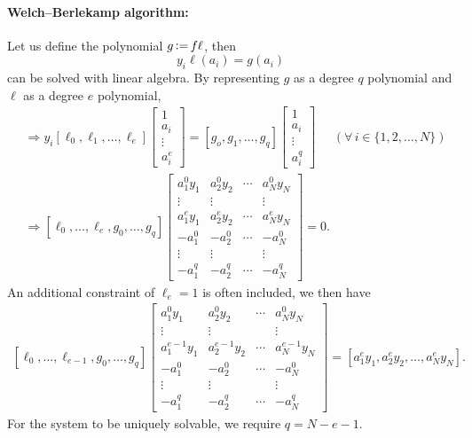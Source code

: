 \paragraph{Welch--Berlekamp algorithm:} Let us define the polynomial $g \operatorname{\vcentcolon=} f\ell$, then
\begin{equation}
    y_i \ell(a_i) = g(a_i)
\end{equation}
can be solved with linear algebra. By representing $g$ as a degree $q$ polynomial and $\ell$ as a degree $e$ polynomial,
\begin{align*}
    &\Rightarrow y_i \left[\ell_0,\ell_1,\ldots,\ell_{e}\right] \left[\begin{matrix}
        1 \\ a_i \\ \vdots \\ a_i^e
    \end{matrix}\right] = \left[g_o,g_1,\ldots,g_q\right]\left[\begin{matrix}
        1 \\ a_i \\ \vdots \\ a_i^q
    \end{matrix}\right] \;\;\;\;\;(\forall \, i\in\{1,2,\ldots,N\}) \\
    &\Rightarrow \left[\ell_0,\ldots,\ell_e,g_0,\ldots,g_q\right] \left[\begin{matrix}
        a_1^0y_1 & a_2^0y_2 & \cdots & a_N^0y_N \\
        \vdots & \vdots & & \vdots \\
        a_1^ey_1 & a_2^ey_2 & \cdots & a_N^ey_N\\
        -a_1^0 & -a_2^0 & \cdots & -a_N^0 \\
        \vdots & \vdots & & \vdots \\
        -a_1^q & -a_2^q & \cdots & -a_N^q
    \end{matrix}\right] = 0.
\end{align*}
An additional constraint of $\ell_e=1$ is often included, we then have
\begin{align*}\left[\ell_0,\ldots,\ell_{e-1},g_0,\ldots,g_q\right] \left[\begin{matrix}
        a_1^0y_1 & a_2^0y_2 & \cdots & a_N^0y_N \\
        \vdots & \vdots & & \vdots \\
        a_1^{e-1}y_1 & a_2^{e-1}y_2 & \cdots & a_N^{e-1}y_N\\
        -a_1^0 & -a_2^0 & \cdots & -a_N^0 \\
        \vdots & \vdots & & \vdots \\
        -a_1^q & -a_2^q & \cdots & -a_N^q
    \end{matrix}\right] = \left[a_1^ey_1, a_2^ey_2, \ldots, a_N^ey_N\right].
\end{align*}
For the system to be uniquely solvable, we require $q=N-e-1$.

